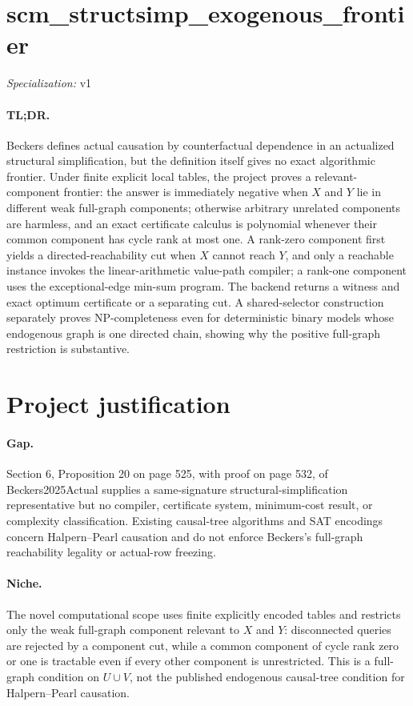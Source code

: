 \documentclass{article}
\begin{document}
\sloppy

\section*{scm\_\allowbreak{}structsimp\_\allowbreak{}exogenous\_\allowbreak{}frontier}

\noindent\textit{Specialization:} v1\par

\paragraph{TL;DR.} Beckers defines actual causation by counterfactual dependence in an actualized structural simplification, but the definition itself gives no exact algorithmic frontier. Under finite explicit local tables, the project proves a relevant-component frontier: the answer is immediately negative when \(X\) and \(Y\) lie in different weak full-graph components; otherwise arbitrary unrelated components are harmless, and an exact certificate calculus is polynomial whenever their common component has cycle rank at most one. A rank-zero component first yields a directed-reachability cut when \(X\) cannot reach \(Y\), and only a reachable instance invokes the linear-arithmetic value-path compiler; a rank-one component uses the exceptional-edge min-sum program. The backend returns a witness and exact optimum certificate or a separating cut. A shared-selector construction separately proves NP-completeness even for deterministic binary models whose endogenous graph is one directed chain, showing why the positive full-graph restriction is substantive.

\section{Project justification}

\paragraph{Gap.} Section 6, Proposition 20 on page 525, with proof on page 532, of Beckers2025Actual supplies a same-signature structural-simplification representative but no compiler, certificate system, minimum-cost result, or complexity classification. Existing causal-tree algorithms and SAT encodings concern Halpern--Pearl causation and do not enforce Beckers's full-graph reachability legality or actual-row freezing.

\paragraph{Niche.} The novel computational scope uses finite explicitly encoded tables and restricts only the weak full-graph component relevant to \(X\) and \(Y\): disconnected queries are rejected by a component cut, while a common component of cycle rank zero or one is tractable even if every other component is unrestricted. This is a full-graph condition on \(U\cup V\), not the published endogenous causal-tree condition for Halpern--Pearl causation.
\end{document}
